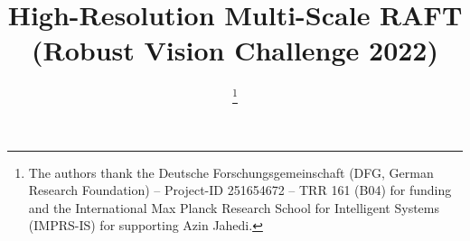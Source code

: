 \documentclass[conference,compsoc,a4paper]{IEEEtran}[2015/08/26]
\begin{document}
\title{High-Resolution Multi-Scale RAFT \\ (Robust Vision Challenge 2022)}

\author{

   
   \thanks{The authors thank the Deutsche Forschungsgemeinschaft (DFG, German Research Foundation) -- Project-ID 251654672 -- TRR 161 (B04) for funding and the International Max Planck Research School for Intelligent Systems (IMPRS-IS) for supporting Azin Jahedi.}
}




\maketitle

\thispagestyle{plain}
\pagestyle{plain}
\end{document}

